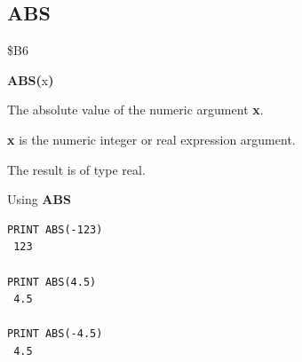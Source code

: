 \subsection{ABS}
\begin{description}[leftmargin=2cm,style=nextline]
\item [Token:]    \$B6

\item [Format:]   {\bf ABS(}x{\bf)}

\item [Returns:]  The absolute value of the numeric argument {\bf x}.

                  {\bf x} is the numeric integer or real expression argument.

\item [Remarks:]  The result is of type real.

\item [Examples:] Using {\bf ABS}

\begin{tcolorbox}[colback=black,coltext=white]
\verbatimfont{\codefont}
\begin{verbatim}
PRINT ABS(-123)
 123

PRINT ABS(4.5)
 4.5

PRINT ABS(-4.5)
 4.5
\end{verbatim}
\end{tcolorbox}
\end{description}


\newpage
